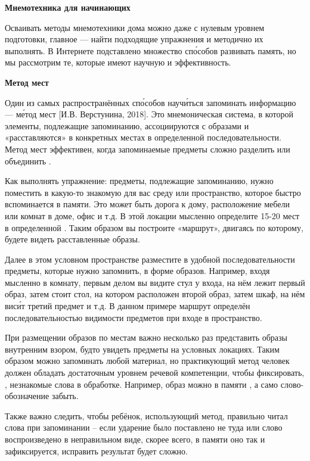 \textbf{Мнемотехника для начинающих}

Осваивать методы мнемотехники дома можно даже с нулевым уровнем подготовки, главное --- найти подходящие упражнения и методично их выполнять. В Интернете подставлено множество сп\'{о}собов развивать память, но мы рассмотрим те, которые имеют научную  и эффективность.

\textbf{Метод мест}

Один из самых распространённых сп\'{о}собов науч\'{и}ться запоминать информацию ---  м\'{е}тод мест [И.В. Верстунина, 2018]. Это мнемоническая система, в которой элементы, подлежащие запоминанию, ассоциируются с образами и «расставляются» в конкретных местах в определенной последовательности. Метод мест эффективен, когда запоминаемые предметы сложно разделить или объединить .

Как выполнять упражнение: предметы, подлежащие запоминанию, нужно поместить в какую-то знакомую для вас среду или пространство, которое быстро вспоминается в памяти. Это может быть дорога к дому, расположение мебели или комнат в доме, офис и т.д. В этой локации мысленно определите 15-20 мест в определенной . Таким образом вы построите «маршрут», двигаясь по которому, будете видеть расставленные образы.

Далее в этом условном пространстве разместите в удобной последовательности предметы, которые нужно запомнить, в форме образов. Например, входя мысленно в комнату, первым делом вы видите стул у входа, на нём лежит первый образ, затем стоит стол, на котором расположен второй образ, затем шкаф, на нём вис\'{и}т третий предмет и т.д. В данном примере маршрут  определён последовательностью видимости предметов при входе в пространство.

При размещении образов по местам важно несколько раз представить образы внутренним взором, будто увидеть предметы на условных локациях. Таким образом можно запоминать любой материал, но практикующий метод человек должен обладать достаточным уровнем речевой компетенции, чтобы фиксировать, , незнакомые слова в обработке. Например, образ можно в памяти , а само слово-обозначение забыть.

Также важно следить, чтобы ребёнок, использующий метод, правильно читал слова при запоминании – если ударение было поставлено не туда или слово воспроизведено в неправильном виде, скорее всего, в памяти оно так и зафиксируется, исправить результат будет сложно.

